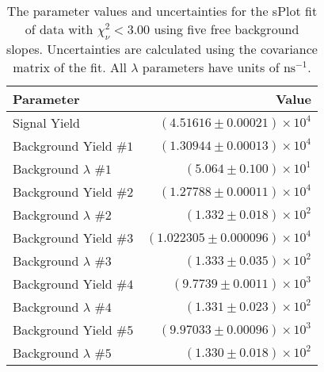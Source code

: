 
\begin{table}[ht]
    \begin{center}
        \begin{tabular}{lr}\toprule
            Parameter & Value \\\midrule
            Signal Yield & $(4.51616 \pm 0.00021) \times 10^{4}$ \\
            Background Yield $\#1$ & $(1.30944 \pm 0.00013) \times 10^{4}$ \\
            Background $\lambda$ $\#1$ & $(5.064 \pm 0.100) \times 10^{1}$ \\
            Background Yield $\#2$ & $(1.27788 \pm 0.00011) \times 10^{4}$ \\
            Background $\lambda$ $\#2$ & $(1.332 \pm 0.018) \times 10^{2}$ \\
            Background Yield $\#3$ & $(1.022305 \pm 0.000096) \times 10^{4}$ \\
            Background $\lambda$ $\#3$ & $(1.333 \pm 0.035) \times 10^{2}$ \\
            Background Yield $\#4$ & $(9.7739 \pm 0.0011) \times 10^{3}$ \\
            Background $\lambda$ $\#4$ & $(1.331 \pm 0.023) \times 10^{2}$ \\
            Background Yield $\#5$ & $(9.97033 \pm 0.00096) \times 10^{3}$ \\
            Background $\lambda$ $\#5$ & $(1.330 \pm 0.018) \times 10^{2}$ \\\bottomrule
        \end{tabular}
        \caption{The parameter values and uncertainties for the sPlot fit of data with $\chi^2_\nu < 3.00$ using five free background slopes. Uncertainties are calculated using the covariance matrix of the fit. All $\lambda$ parameters have units of $\si{\nano\second}^{-1}$.}\label{tab:splot-fit-results-chisqdof-3.00-free-5}
    \end{center}
\end{table}
